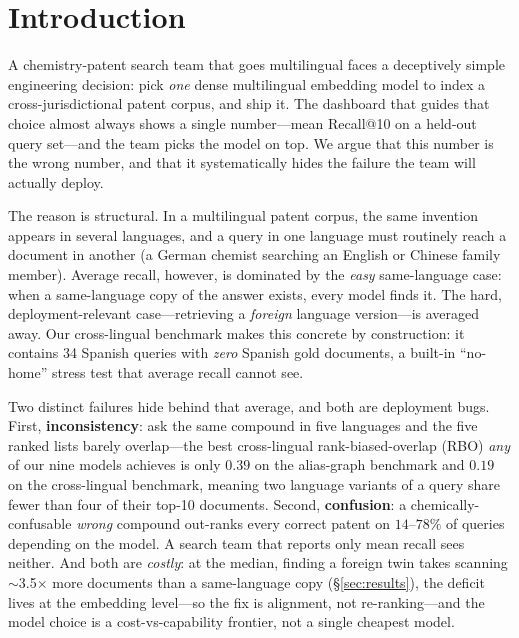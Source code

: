 \documentclass[11pt]{article}
\begin{document}
\section{Introduction}

A chemistry-patent search team that goes multilingual faces a deceptively
simple engineering decision: pick \emph{one} dense multilingual embedding model
to index a cross-jurisdictional patent corpus, and ship it. The dashboard that
guides that choice almost always shows a single number---mean Recall@10 on a
held-out query set---and the team picks the model on top. We argue that this
number is the wrong number, and that it systematically hides the failure the
team will actually deploy.

The reason is structural. In a multilingual patent corpus, the same invention
appears in several languages, and a query in one language must routinely reach
a document in another (a German chemist searching an English or Chinese family
member). Average recall, however, is dominated by the \emph{easy}
same-language case: when a same-language copy of the answer exists, every model
finds it. The hard, deployment-relevant case---retrieving a \emph{foreign}
language version---is averaged away. Our cross-lingual benchmark makes this
concrete by construction: it contains 34 Spanish queries with \emph{zero}
Spanish gold documents, a built-in ``no-home'' stress test that average recall
cannot see.

Two distinct failures hide behind that average, and both are deployment bugs.
First, \textbf{inconsistency}: ask the same compound in five languages and the
five ranked lists barely overlap---the best cross-lingual rank-biased-overlap
(RBO) \emph{any} of our nine models achieves is only $0.39$ on the alias-graph
benchmark and $0.19$ on the cross-lingual benchmark, meaning two language
variants of a query share fewer than four of their top-10 documents. Second,
\textbf{confusion}: a chemically-confusable \emph{wrong} compound out-ranks
every correct patent on $14$--$78\%$ of queries depending on the model. A search
team that reports only mean recall sees neither. And both are \emph{costly}: at
the median, finding a foreign twin takes scanning $\sim$3.5$\times$ more
documents than a same-language copy (\S\ref{sec:results}), the deficit lives
at the embedding level---so the fix is alignment, not re-ranking---and the model
choice is a cost-vs-capability frontier, not a single cheapest model.
\end{document}
